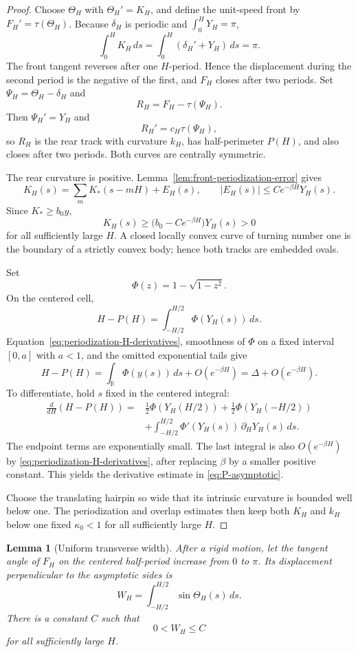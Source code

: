 \documentclass[11pt]{article}
\newtheorem{lemma}[theorem]{Lemma}
\theoremstyle{remark}
\newcommand{\R}{\mathbb R}
\begin{document}
\begin{proof}
Choose \(\Theta_H\) with \(\Theta_H'=K_H\), and define the unit-speed
front by \(F_H'=\tau(\Theta_H)\).  Because \(\delta_H\) is periodic and
\(\int_0^H Y_H=\pi\),
\[
   \int_0^H K_H\,ds
   =\int_0^H(\delta_H'+Y_H)\,ds
   =\pi.
\]
The front tangent reverses after one \(H\)-period.  Hence the displacement
during the second period is the negative of the first, and \(F_H\) closes
after two periods.  Set \(\Psi_H=\Theta_H-\delta_H\) and
\[
   R_H=F_H-\tau(\Psi_H).
\]
Then \(\Psi_H'=Y_H\) and
\[
   R_H'=c_H\tau(\Psi_H),
\]
so \(R_H\) is the rear track with curvature \(k_H\), has half-perimeter
\(P(H)\), and also closes after two periods.  Both curves are centrally
symmetric.

The rear curvature is positive.  Lemma~\ref{lem:front-periodization-error}
gives
\[
   K_H(s)
   =\sum_m K_*(s-mH)+E_H(s),
   \qquad
   |E_H(s)|\leq Ce^{-\beta H}Y_H(s).
\]
Since \(K_*\geq b_0y\),
\[
   K_H(s)\geq\bigl(b_0-Ce^{-\beta H}\bigr)Y_H(s)>0
\]
for all sufficiently large \(H\).  A closed locally convex curve of turning
number one is the boundary of a strictly convex body; hence both tracks are
embedded ovals.

Set
\[
   \Phi(z)=1-\sqrt{1-z^2}.
\]
On the centered cell,
\[
   H-P(H)=\int_{-H/2}^{H/2}\Phi(Y_H(s))\,ds.
\]
Equation~\eqref{eq:periodization-H-derivatives}, smoothness of \(\Phi\) on a
fixed interval \([0,a]\) with \(a<1\), and the omitted exponential tails give
\[
   H-P(H)=\int_\R \Phi(y(s))\,ds+O(e^{-\beta H})
          =\Delta+O(e^{-\beta H}).
\]
To differentiate, hold \(s\) fixed in the centered integral:
\[
\begin{aligned}
   \frac d{dH}(H-P(H))
   ={}&\frac12\Phi(Y_H(H/2))
      +\frac12\Phi(Y_H(-H/2))\\
     &+\int_{-H/2}^{H/2}
       \Phi'(Y_H(s))\,\partial_HY_H(s)\,ds.
\end{aligned}
\]
The endpoint terms are exponentially small.  The last integral is also
\(O(e^{-\beta H})\) by \eqref{eq:periodization-H-derivatives}, after
replacing \(\beta\) by a smaller positive constant.  This yields the
derivative estimate in \eqref{eq:P-asymptotic}.

Choose the translating hairpin so wide that its intrinsic curvature is bounded
well below one.  The periodization and overlap estimates then keep both
\(K_H\) and \(k_H\) below one fixed \(\kappa_0<1\) for all sufficiently
large \(H\).
\end{proof}

\begin{lemma}[Uniform transverse width]\label{lem:width}
After a rigid motion, let the tangent angle of \(F_H\) on the centered
half-period increase from \(0\) to \(\pi\).  Its displacement perpendicular
to the asymptotic sides is
\[
   W_H=\int_{-H/2}^{H/2}\sin\Theta_H(s)\,ds.
\]
There is a constant \(C\) such that
\[
   0<W_H\leq C
\]
for all sufficiently large \(H\).
\end{lemma}
\end{document}
